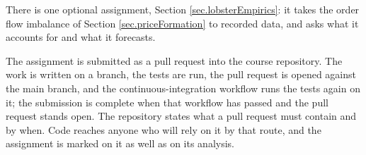 There is one optional assignment, Section \ref{sec.lobsterEmpirics}:
it takes the order flow imbalance of Section \ref{sec.priceFormation} to recorded data,
and asks what it accounts for and what it forecasts.

The assignment is submitted as a pull request into the course repository.
The work is written on a branch,
the tests are run,
the pull request is opened against the main branch,
and the continuous-integration workflow runs the tests again on it;
the submission is complete when that workflow has passed and the pull request stands open.
The repository states what a pull request must contain and by when.
Code reaches anyone who will rely on it by that route,
and the assignment is marked on it as well as on its analysis.
